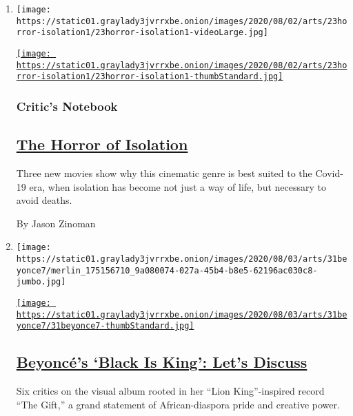 \begin{enumerate}
\def\labelenumi{\arabic{enumi}.}
\item
  \texttt{[image: https://static01.graylady3jvrrxbe.onion/images/2020/08/02/arts/23horror-isolation1/23horror-isolation1-videoLarge.jpg]}

  \href{/2020/07/29/movies/horror-she-dies-tomorrow-relic-amulet.html}{\texttt{[image: https://static01.graylady3jvrrxbe.onion/images/2020/08/02/arts/23horror-isolation1/23horror-isolation1-thumbStandard.jpg]}}

  \hypertarget{critics-notebook}{%
  \subsubsection{Critic's Notebook}\label{critics-notebook}}

  \hypertarget{the-horror-of-isolation}{%
  \subsection{\texorpdfstring{\href{/2020/07/29/movies/horror-she-dies-tomorrow-relic-amulet.html}{The
  Horror of
  Isolation}}{The Horror of Isolation}}\label{the-horror-of-isolation}}

  Three new movies show why this cinematic genre is best suited to the
  Covid-19 era, when isolation has become not just a way of life, but
  necessary to avoid deaths.

  By Jason Zinoman
\item
  \texttt{[image: https://static01.graylady3jvrrxbe.onion/images/2020/08/03/arts/31beyonce7/merlin\_175156710\_9a080074-027a-45b4-b8e5-62196ac030c8-jumbo.jpg]}

  \href{/2020/07/31/arts/music/beyonce-black-is-king.html}{\texttt{[image: https://static01.graylady3jvrrxbe.onion/images/2020/08/03/arts/31beyonce7/31beyonce7-thumbStandard.jpg]}}

  \hypertarget{beyoncuxe9s-black-is-king-lets-discuss}{%
  \subsection{\texorpdfstring{\href{/2020/07/31/arts/music/beyonce-black-is-king.html}{Beyoncé's
  `Black Is King': Let's
  Discuss}}{Beyoncé's `Black Is King': Let's Discuss}}\label{beyoncuxe9s-black-is-king-lets-discuss}}

  Six critics on the visual album rooted in her ``Lion King''-inspired
  record ``The Gift,'' a grand statement of African-diaspora pride and
  creative power.


\end{enumerate}
